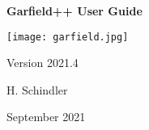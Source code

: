 \begin{titlepage}
  {
  \centering
  \sffamily
  \linespread{1.5}

  \vspace{3cm} 

  \huge{\textbf{Garfield++ User Guide}}

  \vspace{2cm}

  \texttt{[image: garfield.jpg]}

  \vspace{2cm}

  \large
  Version 2021.4

  \vspace{2cm}
  \large
  H. Schindler

  \vfill

  September 2021

  }
\end{titlepage}
